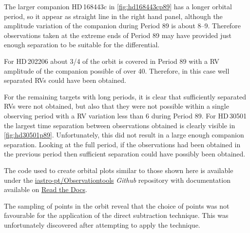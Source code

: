 The larger companion {HD\,168443}c in \cref{fig:hd168443cp89} has a longer orbital period, so it appear as straight line in the right hand panel, although the amplitude variation of the companion during {Period 89} is about 8--9\kmps.
Therefore observations taken at the extreme ends of {Period 89} may have provided just enough separation to be suitable for the differential.

For HD\,202206 about 3/4 of the orbit is covered in {Period 89} with a {RV} amplitude of the companion possible of over 40\kmps{}.
Therefore, in this case well separated {RV}s could have been obtained.

For the remaining targets with long periods, it is clear that sufficiently separated {RV}s were not obtained, but also that they were not possible within a single observing period with a {RV} variation less than 6\kmps{} during {Period 89}.
For HD\,30501 the largest time separation between observations obtained is clearly visible in \cref{fig:hd30501p89}.
Unfortunately, this did not result in a large enough companion separation.
Looking at the full period, if the observations had been obtained in the previous period then sufficient separation could have possibly been obtained.

The code used to create orbital plots similar to those shown here is available under the \href{https://github.com/iastro-pt/ObservationTools}{iastro-pt/Observationtools} \emph{Github} repository with documentation available on \href{https://ia-observationtools.readthedocs.io/en/latest/rv.html}{Read the Docs}.

The sampling of points in the orbit reveal that the choice of points was not favourable for the application of the direct subtraction technique.
This was unfortunately discovered after attempting to apply the technique.



